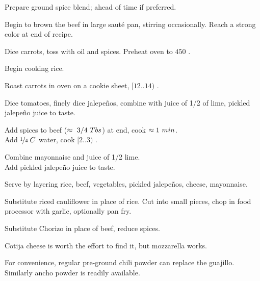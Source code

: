 
\begin{preparation}
\item Prepare ground spice blend; ahead of time if preferred.

\item Begin to brown the beef in large saut\'{e} pan, stirring occasionally. Reach a strong color at end of recipe.

\item Dice carrots, toss with oil and spices. Preheat oven to $450$ \Fahrenheit.

\item Begin cooking rice.

\item Roast carrots in oven on a cookie sheet, $[12..14)$ \minute.

\item Dice tomatoes, finely dice jalepe\~{n}os, combine with juice of 1/2 of lime, pickled jalepe\~{n}o juice to taste.

\item Add spices to beef ($\approx~3/4\ \Tablespoon$) at end, cook $\approx1~\minute$.\\
	Add $\onefourth\;C$ water, cook $[2..3)$ \minute.

\item Combine mayonnaise and juice of 1/2 lime.\\Add pickled jalepe\~{n}o juice to taste.

\item Serve by layering rice, beef, vegetables, pickled jalepe\~{n}os, cheese, mayonnaise.
\end{preparation}

\begin{variation}
\item Substitute riced cauliflower in place of rice. Cut into small pieces, chop in food processor with garlic, optionally pan fry.
\item Substitute Chorizo in place of beef, reduce spices.
\item Cotija cheese is worth the effort to find it, but mozzarella works.
\item For convenience, regular pre-ground chili powder can replace the guajillo. Similarly ancho powder is readily available.
\end{variation}

\recipeend%
